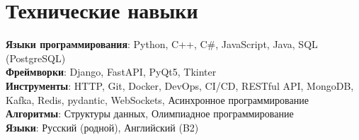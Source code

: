 \documentclass[letterpaper,11pt]{article}
\begin{document}
\section{Технические навыки}
 \begin{itemize}[leftmargin=0.15in, label={}]
    \small{\item{
     \textbf{Языки программирования}{: Python, C++, C\#, JavaScript, Java, SQL (PostgreSQL)} \\
     \textbf{Фреймворки}{: Django, FastAPI, PyQt5, Tkinter} \\
     \textbf{Инструменты}{: HTTP, Git, Docker, DevOps, CI/CD, RESTful API, MongoDB, Kafka, Redis, pydantic, WebSockets, Асинхронное программирование} \\
     \textbf{Алгоритмы}{: Структуры данных, Олимпиадное программирование} \\
     \textbf{Языки}{: Русский (родной), Английский (B2)}
    }}
 \end{itemize}
\end{document}
